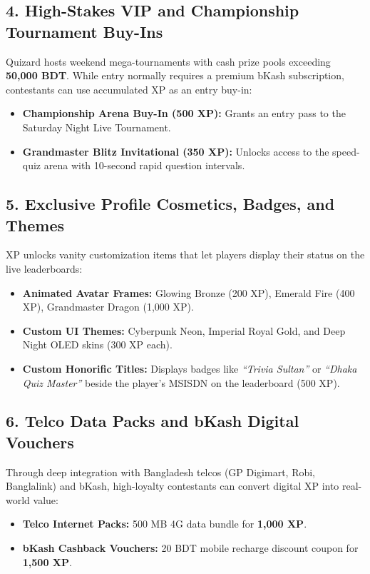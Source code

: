 \subsection{4. High-Stakes VIP and Championship Tournament Buy-Ins}
Quizard hosts weekend mega-tournaments with cash prize pools exceeding \textbf{50,000 BDT}. While entry normally requires a premium bKash subscription, contestants can use accumulated XP as an entry buy-in:
\begin{itemize}
    \item \textbf{Championship Arena Buy-In (500 XP):} Grants an entry pass to the Saturday Night Live Tournament.
    \item \textbf{Grandmaster Blitz Invitational (350 XP):} Unlocks access to the speed-quiz arena with 10-second rapid question intervals.
\end{itemize}

\subsection{5. Exclusive Profile Cosmetics, Badges, and Themes}
XP unlocks vanity customization items that let players display their status on the live leaderboards:
\begin{itemize}
    \item \textbf{Animated Avatar Frames:} Glowing Bronze (200 XP), Emerald Fire (400 XP), Grandmaster Dragon (1,000 XP).
    \item \textbf{Custom UI Themes:} Cyberpunk Neon, Imperial Royal Gold, and Deep Night OLED skins (300 XP each).
    \item \textbf{Custom Honorific Titles:} Displays badges like \textit{``Trivia Sultan''} or \textit{``Dhaka Quiz Master''} beside the player's MSISDN on the leaderboard (500 XP).
\end{itemize}

\subsection{6. Telco Data Packs and bKash Digital Vouchers}
Through deep integration with Bangladesh telcos (GP Digimart, Robi, Banglalink) and bKash, high-loyalty contestants can convert digital XP into real-world value:
\begin{itemize}
    \item \textbf{Telco Internet Packs:} 500 MB 4G data bundle for \textbf{1,000 XP}.
    \item \textbf{bKash Cashback Vouchers:} 20 BDT mobile recharge discount coupon for \textbf{1,500 XP}.
\end{itemize}


